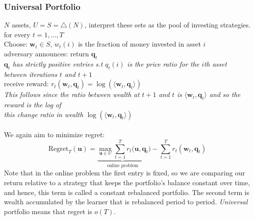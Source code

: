 \documentclass[11pt]{article}
\newcommand\tab[1][1cm]{\hspace*{#1}}
\theoremstyle{quest}
\begin{document}
\subsubsection{Universal Portfolio} 
$N $ assets, $U=S=\triangle(N)$, interpret these sets as the pool of investing strategies. \\
for every $t=1, \dots, T$\\
\tab Choose: $\mathbf{w}_t\in S$, $w_t(i)$ is the fraction of money invested in asset $i$\\ 
\tab adversary announces: return $\mathbf{q}_t$\\
\tab \tab \textit{$\mathbf{q}_t$ has strictly positive entries s.t  $q_t(i)$ is the price ratio for the $i$th asset between iterations $t$ and $t+1$}\\
%
\tab receive reward: $r_t(\mathbf{w}_t,\mathbf{q}_t)= \log(\langle \mathbf{w}_t, \mathbf{q}_t \rangle)$\\
\tab \tab \textit{This follows since the ratio between wealth at $t+1$ and $t$ is $\langle \mathbf{w}_t, \mathbf{q}_t \rangle$ and so the reward is the log of \\
\tab \tab this change ratio in wealth $\log(\langle \mathbf{w}_t, \mathbf{q}_t \rangle)$}\\ \\ 
%
We again aim to minimize regret:
$$\text{Regret}_T(\mathbf{u})= \underbrace{\max_{\mathbf{u}\in U}\sum_{t=1}^T  r_t(\mathbf{u},\mathbf{q}_t}_{\text{online problem}})- \sum_{t=1}^T r_t(\mathbf{w}_t,\mathbf{q}_t)$$ 
Note that in the online problem the first entry is fixed, so we are comparing our return relative to a strategy that keeps the portfolio's balance constant over time, and hence, this term is called a constant rebalanced portfolio. The second term is wealth accumulated by the learner that is rebalanced period to period. \textit{Universal} portfolio means that regret is $o(T)$.
\end{document}

